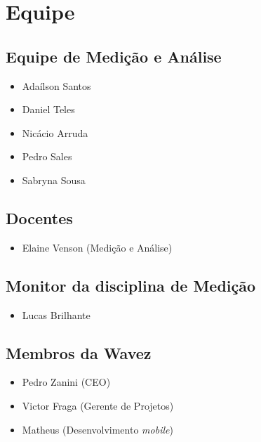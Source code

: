 \chapter{Equipe}

\section{Equipe de Medição e Análise}
\begin{itemize}
\item Adaílson Santos
\item Daniel Teles
\item Nicácio Arruda
\item Pedro Sales
\item Sabryna Sousa
\end{itemize}

\section{Docentes}
\begin{itemize}
\item Elaine Venson (Medição e Análise)
\end{itemize}

\section{Monitor da disciplina de Medição}
\begin{itemize}
\item Lucas Brilhante
\end{itemize}

\section{Membros da Wavez}
\begin{itemize}
\item Pedro Zanini (CEO)
\item Victor Fraga (Gerente de Projetos)
\item Matheus (Desenvolvimento \textit{mobile})
\end{itemize}
